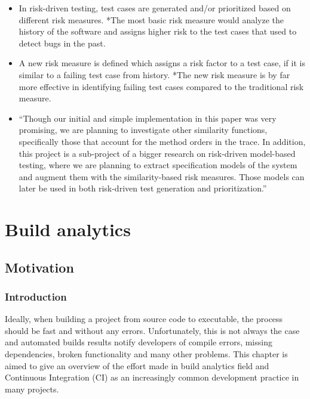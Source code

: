 \documentclass[]{book}
\providecommand{\tightlist}{%
  \setlength{\itemsep}{0pt}\setlength{\parskip}{0pt}}
\begin{document}
\begin{itemize}
\tightlist
\item
  In risk-driven testing, test cases are generated and/or prioritized
  based on different risk measures. *The most basic risk measure would
  analyze the history of the software and assigns higher risk to the
  test cases that used to detect bugs in the past.
\item
  A new risk measure is defined which assigns a risk factor to a test
  case, if it is similar to a failing test case from history. *The new
  risk measure is by far more effective in identifying failing test
  cases compared to the traditional risk measure.
\item
  ``Though our initial and simple implementation in this paper was very
  promising, we are planning to investigate other similarity functions,
  specifically those that account for the method orders in the trace. In
  addition, this project is a sub-project of a bigger research on
  risk-driven model-based testing, where we are planning to extract
  specification models of the system and augment them with the
  similarity-based risk measures. Those models can later be used in both
  risk-driven test generation and prioritization.''
\end{itemize}

\chapter{Build analytics}\label{build-analytics}

\section{Motivation}\label{motivation-1}

\subsection{Introduction}\label{introduction}

Ideally, when building a project from source code to executable, the
process should be fast and without any errors. Unfortunately, this is
not always the case and automated builds results notify developers of
compile errors, missing dependencies, broken functionality and many
other problems. This chapter is aimed to give an overview of the effort
made in build analytics field and Continuous Integration (CI) as an
increasingly common development practice in many projects.
\end{document}
